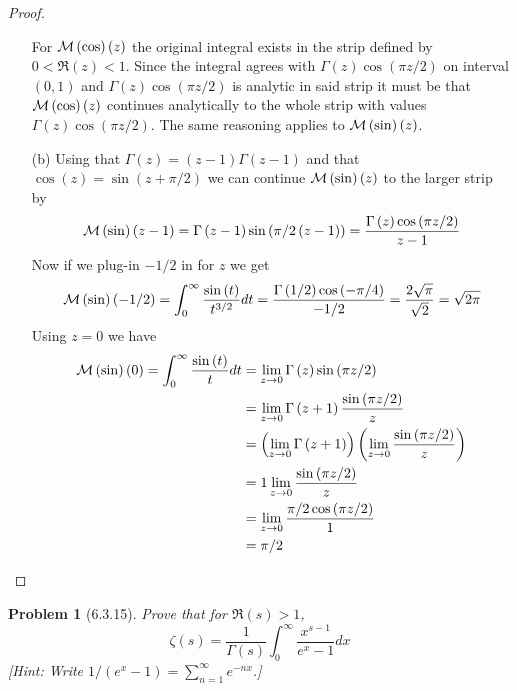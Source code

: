 \documentclass[10pt]{article}
\newcommand{\sk}{\vskip 6mm}
\theoremstyle{plain}
\newtheorem{problem}{Problem}
\theoremstyle{remark}
\begin{document}
\begin{proof}
\begin{enumerate}
    
    For ${\cal M}\left(\cos\right)\left(z\right)$ the original integral exists in the strip defined
    by $0<\Re\left(z\right)<1$. Since the integral agrees with $\Gamma\left(z\right)\cos\left(\pi z/2\right)$ on
    interval $\left(0,1\right)$ and $\Gamma\left(z\right)\cos\left(\pi z/2\right)$ is analytic in said strip it
    must be that ${\cal M}\left(\cos\right)\left(z\right)$ continues analytically to the whole
    strip with values $\Gamma\left(z\right)\cos\left(\pi z/2\right)$. The same reasoning applies
    to ${\cal M}\left(\sin\right)\left(z\right)$.
  \item[(b)] Using that $\Gamma\left(z\right)=\left(z-1\right)\Gamma\left(z-1\right)$ and that $\cos\left(z\right)=\sin\left(z+\pi/2\right)$
    we can continue ${\cal M}\left(\sin\right)\left(z\right)$ to the larger strip by
    \[
      {\cal M}\left(\sin\right)\left(z-1\right)=\Gamma\left(z-1\right)\sin\left(\pi/2\left(z-1\right)\right)=\frac{\Gamma\left(z\right)\cos\left(\pi z/2\right)}{z-1}
    \]
    Now if we plug-in $-1/2$ in for $z$ we get
    \[
      {\cal M}\left(\sin\right)\left(-1/2\right)=\int_0^\infty \frac{\sin\left(t\right)}{t^{3/2}}dt = \frac{\Gamma\left(1/2\right)\cos\left(-\pi/4\right)}{-1/2}=\frac{2\sqrt{\pi}}{\sqrt{2}}=\sqrt{2\pi}
    \]
    Using $z=0$ we have
    \begin{align*}
      {\cal M}\left(\sin\right)\left(0\right)=\int_0^\infty\frac{\sin\left(t\right)}{t}dt &= \lim_{z\rightarrow 0}\Gamma\left(z\right)\sin\left(\pi z/2\right)\\
                                                 &= \lim_{z\rightarrow 0}\Gamma\left(z+1\right)\frac{\sin\left(\pi z/2\right)}{z}\\
                                                 &=\left(\lim_{z\rightarrow 0}\Gamma\left(z+1\right)\right)\left(\lim_{z\rightarrow 0}\frac{\sin\left(\pi z/2\right)}{z}\right)\\
                                                 &=1\lim_{z\rightarrow 0}\frac{\sin\left(\pi z/2\right)}{z}\\
                                                 &=\lim_{z\rightarrow 0}\frac{\pi/2\cos\left(\pi z/2\right)}{1}\\
                                                 &=\pi/2
    \end{align*}
  \end{enumerate}
\end{proof}

\sk

\begin{problem}[6.3.15]
  Prove that for $\Re\left(s\right)>1$,
  \[
    \zeta\left(s\right)=\frac{1}{\Gamma\left(s\right)}\int_0^\infty\frac{x^{s-1}}{e^x-1}dx
  \]
  [Hint: Write $1/\left(e^x-1\right)=\sum_{n=1}^\infty e^{-nx}$.]
\end{problem}
\end{document}

